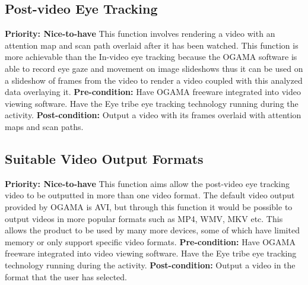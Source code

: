 \subsection{Post-video Eye Tracking}
    \textbf{Priority: Nice-to-have}\newline
    This function involves rendering a video with an attention map and scan path overlaid after it has been watched. This function is more achievable than the In-video eye tracking because the OGAMA software is able to record eye gaze and movement on image slideshows thus it can be used on a slideshow of frames from the video to render a video coupled with this analyzed data overlaying it.\newline
\textbf{Pre-condition: }Have OGAMA freeware integrated into video viewing software. Have the Eye tribe eye tracking technology running during the activity.\newline   
\textbf{Post-condition: }Output a video with its frames overlaid with attention maps and scan paths.

\subsection{Suitable Video Output Formats} 
    \textbf{Priority: Nice-to-have}\newline
    This function aims allow the post-video eye tracking video to be outputted in more than one video format. The default video output provided by OGAMA is AVI, but through this function it would be possible to output videos in more popular formats such as MP4, WMV, MKV etc. This allows the product to be used by many more devices, some of which have limited memory or only support specific video formats.\newline
    \textbf{Pre-condition: }Have OGAMA freeware integrated into video viewing software. Have the Eye tribe eye tracking technology running during the activity.\newline
    \textbf{Post-condition: }Output a video in the format that the user has selected.
